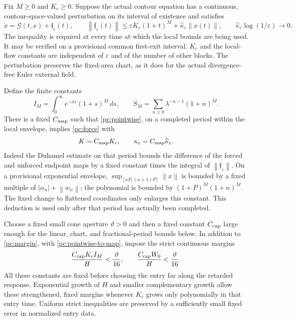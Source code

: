 \documentclass[11pt]{amsart}
\theoremstyle{remark}
\numberwithin{equation}{section}
\newcommand{\norm}[1]{\left\lVert#1\right\rVert}
\begin{document}
Fix $M\ge0$ and $K_c\ge0$. Suppose the actual contour equation has a
continuous, contour-space-valued perturbation on its interval of
existence and satisfies
\begin{equation}\label{pc:pointwise}
 \dot x=\mathcal G(t,x)+\mathfrak f_\varepsilon(t),\qquad
 \norm{\mathfrak f_\varepsilon(t)}
 \le \varepsilon K_c(1+t)^M
       +\widehat\kappa_\varepsilon\norm{x(t)},\qquad
 \widehat\kappa_\varepsilon\log(1/\varepsilon)\longrightarrow0.
\end{equation}
The inequality is required at every time at which the local
bounds are being used. It may be verified on a provisional common
first-exit interval. $K_c$ and the local-flow constants are independent
of $\varepsilon$ and of the number of other blocks. The perturbation
preserves the fixed-area chart, as it does for the actual divergence-free
Euler external field.

Define the finite constants
\[
 I_M=\int_0^\infty e^{-\sigma s}(1+s)^M\,ds,\qquad
 S_M=\sum_{n\ge0}\lambda^{-n-1}(1+n)^M.
\]
There is a fixed $C_{\rm map}$ such that
\eqref{pc:pointwise}, on a completed period within the local envelope,
implies \eqref{pc:force} with
\begin{equation}\label{pc:pointwise-to-map}
 K=C_{\rm map}K_c,\qquad
 \kappa_\varepsilon=C_{\rm map}\widehat\kappa_\varepsilon.
\end{equation}
Indeed the Duhamel estimate on that period bounds the difference of
the forced and unforced endpoint maps by a fixed constant times the
integral of $\norm{\mathfrak f_\varepsilon}$. On a provisional
exponential envelope, $\sup_{[nP,(n+1)P]}\norm{x}$ is bounded by a
fixed multiple of $|\alpha_n|+\norm{w_n}$; the polynomial is bounded by
$(1+P)^M(1+n)^M$. The fixed change to flattened coordinates only
enlarges this constant. This deduction is used only after that period
has actually been completed.

Choose a fixed small cone aperture $\vartheta>0$ and then a fixed
constant $C_{\rm cap}$ large enough for the linear, chart, and
fractional-period bounds below. In addition to \eqref{pc:margin},
with \eqref{pc:pointwise-to-map}, impose the strict continuous margins
\begin{equation}\label{pc:continuous-margin}
 \frac{C_{\rm cap}K_c I_M}{H}<\frac{\vartheta}{16},\qquad
 \frac{C_{\rm cap}W_0}{H}<\frac{\vartheta}{16}.
\end{equation}
All these constants are fixed before choosing the entry far along the
retarded response. Exponential growth of $H$ and smaller complementary
growth allow these strengthened, fixed margins whenever $K_c$ grows
only polynomially in that entry time. Uniform strict inequalities are
preserved by a sufficiently small fixed error in normalized entry data.
\end{document}

